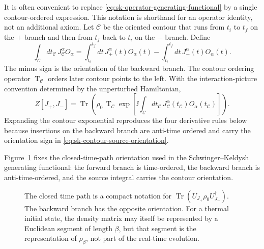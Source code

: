 It is often convenient to replace \eqref{eq:sk-operator-generating-functional}
by a single contour-ordered expression.  This notation is shorthand for an
operator identity, not an additional axiom.  Let \(\mathcal C\) be the
oriented contour that runs from \(t_i\) to \(t_f\) on the \(+\) branch and
then from \(t_f\) back to \(t_i\) on the \(-\) branch.  Define
\begin{equation}
  \int_{\mathcal C} dt_{\mathcal C}\, J_{\mathcal C}^\alpha O_\alpha
  =
  \int_{t_i}^{t_f}dt\,J_+^\alpha(t)O_\alpha(t)
  -
  \int_{t_i}^{t_f}dt\,J_-^\alpha(t)O_\alpha(t).
  \label{eq:sk-contour-source-orientation}
\end{equation}
The minus sign is the orientation of the backward branch.  The contour
ordering operator \(\operatorname{T}_{\mathcal C}\) orders later contour
points to the left.  With the interaction-picture convention determined by
the unperturbed Hamiltonian,
\begin{equation}
  Z[J_+,J_-]
  =
  \operatorname{Tr}\!\left(
    \rho_0\,
    \operatorname{T}_{\mathcal C}
    \exp\!\left[
      \ii\int_{\mathcal C}dt_{\mathcal C}\,
      J_{\mathcal C}^\alpha(t_{\mathcal C})O_\alpha(t_{\mathcal C})
    \right]\right).
  \label{eq:sk-contour-ordered-generating-functional}
\end{equation}
Expanding the contour exponential reproduces the four derivative rules below
because insertions on the backward branch are anti-time ordered and carry the
orientation sign in \eqref{eq:sk-contour-source-orientation}.

Figure~\ref{fig:sk-closed-time-path} fixes the closed-time-path orientation used
in the Schwinger--Keldysh generating functional: the forward branch is
time-ordered, the backward branch is anti-time-ordered, and the source integral
carries the contour orientation.

\begin{figure}[H]
\centering
{}
\caption{The closed time path is a compact notation for
\(\operatorname{Tr}(U_{J_+}\rho_0U_{J_-}^{\dagger})\).  The backward branch
has the opposite orientation.  For a thermal initial state, the density
matrix may itself be represented by a Euclidean segment of length \(\beta\),
but that segment is the representation of \(\rho_\beta\), not part of the
real-time evolution.}
\label{fig:sk-closed-time-path}
\end{figure}

